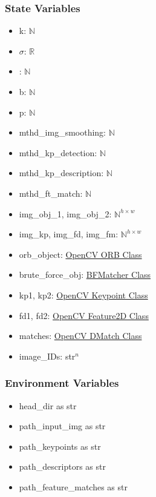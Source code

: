 \documentclass[12pt, titlepage]{article}
\begin{document}
\subsubsection{State Variables}
\begin{itemize}
  \item k: $\mathbb{N}$
  \item $\sigma$: $\mathbb{R}$
  \item : $\mathbb{N}$
  \item b: $\mathbb{N}$
  \item p: $\mathbb{N}$
  \item mthd\_img\_smoothing: $\mathbb{N}$
  \item mthd\_kp\_detection: $\mathbb{N}$
  \item mthd\_kp\_description: $\mathbb{N}$
  \item mthd\_ft\_match: $\mathbb{N}$
  \item img\_obj\_1, img\_obj\_2: $\mathbb{N}^{h \times w}$ 
  \item img\_kp, img\_fd, img\_fm: $\mathbb{N}^{h \times w}$
  \item orb\_object: \href{https://docs.opencv.org/3.4/db/d95/classcv_1_1ORB.html}{OpenCV ORB Class}
  \item brute\_force\_obj: \href{https://docs.opencv.org/3.4/d3/da1/classcv_1_1BFMatcher.html}{BFMatcher Class}
  \item kp1, kp2: \href{https://docs.opencv.org/3.4/d2/d29/classcv_1_1KeyPoint.html}{OpenCV Keypoint Class}
  \item fd1, fd2: \href{https://docs.opencv.org/4.x/d0/d13/classcv_1_1Feature2D.html}{OpenCV Feature2D Class}
  \item matches: \href{https://docs.opencv.org/3.4/d4/de0/classcv_1_1DMatch.html}{OpenCV DMatch Class}
  \item image\_IDs: str$^{n}$
\end{itemize}



\subsubsection{Environment Variables}
\begin{itemize}
  \item head\_dir as str
  \item path\_input\_img as str 
  \item path\_keypoints as str
  \item path\_descriptors as str
  \item path\_feature\_matches as str
\end{itemize}
\end{document}
